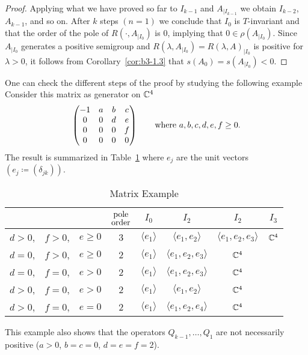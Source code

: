 \begin{proof}
	Applying what we have proved so far to $I_{k-1}$ and $A_{|I_{k-1}}$ we obtain $I_{k-2}$, $A_{k-1}$, and so on.
	After $k$ steps $(n=1)$ we conclude that $I_{0}$ is $T$-invariant and that the order of the pole of $R(\cdot,A_{|I_{0}})$ is $0$, 
	implying that $0 \in \rho(A_{|I_{0}})$.
	Since $A_{|I_{0}}$ generates a positive semigroup and $R(\lambda,A_{|I_{0}}) = R(\lambda,A)_{|I_{0}}$ is positive for $\lambda > 0$, it follows from Corollary~\ref{cor:b3-1.3} that $s(A_{0}) = s(A_{|I_{0}}) < 0$.
\end{proof}
One can check the different steps of the proof by studying the following example
Consider this matrix as generator on $\mathbb{C}^{4}$
\[
\begin{pmatrix}
	-1 & a & b & c \\
	0 & 0 & d & e \\
	0 & 0 & 0 & f \\
	0 & 0 & 0 & 0
\end{pmatrix}
\quad \quad \text{where $ a,b,c,d,e,f \geq 0 $.} 
\]
The result is summarized in Table~\ref{tab:b3-table1} where 
$e_{j}$ are the unit vectors $(e_{j} \coloneqq (\delta_{jk}))$.
\begin{table}[ht!]%
% 
\begin{center}
 \caption{Matrix Example}\label{tab:b3-table1}
\begin{tabular}{lll|c|cccc} %
		 &&& $ \overset{\text{\normalsize pole}}{\text{order}}$ & $I_0$ & $I_2$ & $I_2$ & $I_3$ \\[1ex]\hline
		$ d > 0 $, & $ f>0 $, &  $ e \ge 0 $ & 3 & $\langle e_1 \rangle$ &  $\langle e_1, e_2 \rangle$ &  $\langle e_1, e_2, e_3 \rangle$ &  $\mathbb{C}^4$\\
		$ d = 0 $, & $ f > 0 $, & $ e \ge 0 $ & 2 & $\langle e_1 \rangle$ &  $\langle e_1, e_2, e_3 \rangle$ &  $\mathbb{C}^4$ & \\	
		$ d = 0 $, & $ f = 0 $, & $ e > 0 $ & 2 & $\langle e_1 \rangle$ &  $\langle e_1, e_2, e_3 \rangle$ &  $\mathbb{C}^4$ & \\
		$ d > 0 $, & $ f = 0 $, & $ e > 0 $ & 2 & $\langle e_1 \rangle$ &  $\langle e_1, e_2 \rangle$ &  $\mathbb{C}^4$ & \\			
		$ d > 0 $, & $ f = 0 $, & $ e = 0 $ & 2 & $\langle e_1 \rangle$ &  $\langle e_1, e_2, e_4 \rangle$ &  $\mathbb{C}^4$ & \\	
\end{tabular}
\end{center}
\end{table}
This example also shows that the operators $Q_{k-1}, \ldots, Q_{1}$ are not necessarily positive (\eg $a>0$, $b=c=0$, $d=e=f=2$).

